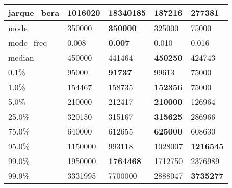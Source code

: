 \begin{table}[H]
\begin{tabular}{|l|m{10em}|m{10em}|m{10em}|m{10em}|}
\hline jarque\_bera & 1016020 & \cellcolor[rgb]{0.9, 0.54, 0.52} 18340185 & 187216 & \bfseries 277381 \\
\hline mode & 350000 & \bfseries 350000 & 325000 & \cellcolor[rgb]{0.9, 0.54, 0.52} 75000 \\
\hline mode\_freq & 0.008 & \bfseries 0.007 & 0.010 & \cellcolor[rgb]{0.9, 0.54, 0.52} 0.016 \\
\hline median & 450000 & 441464 & \bfseries 450250 & \cellcolor[rgb]{0.9, 0.54, 0.52} 424743 \\
\hline 0.1\% & 95000 & \bfseries 91737 & 99613 & \cellcolor[rgb]{0.9, 0.54, 0.52} 75000 \\
\hline 1.0\% & 154467 & 158735 & \bfseries 152356 & \cellcolor[rgb]{0.9, 0.54, 0.52} 75000 \\
\hline 5.0\% & 210000 & 212417 & \bfseries 210000 & \cellcolor[rgb]{0.9, 0.54, 0.52} 126964 \\
\hline 25.0\% & 320150 & 315167 & \bfseries 315625 & \cellcolor[rgb]{0.9, 0.54, 0.52} 286966 \\
\hline 75.0\% & 640000 & 612655 & \bfseries 625000 & \cellcolor[rgb]{0.9, 0.54, 0.52} 608630 \\
\hline 95.0\% & 1150000 & \cellcolor[rgb]{0.9, 0.54, 0.52} 993118 & 1028007 & \bfseries 1216545 \\
\hline 99.0\% & 1950000 & \bfseries 1764468 & 1712750 & \cellcolor[rgb]{0.9, 0.54, 0.52} 2376989 \\
\hline 99.9\% & 3331995 & \cellcolor[rgb]{0.9, 0.54, 0.52} 7700000 & 2888047 & \bfseries 3735277 \\
\hline
\end{tabular}
\end{table}
